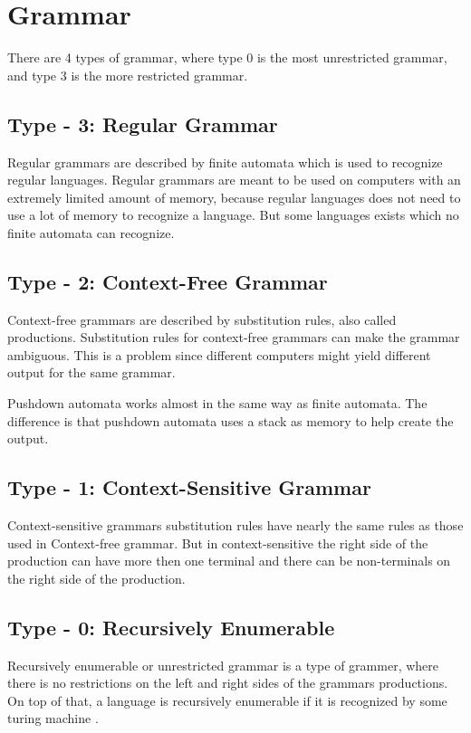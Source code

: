 \section{Grammar}
There are 4 types of grammar, where type 0 is the most unrestricted grammar, and type 3 is the more restricted grammar.

\subsection{Type - 3: Regular Grammar}
Regular grammars are described by finite automata which is used to recognize regular languages. Regular grammars are meant to be used on computers with an extremely limited amount of memory, because regular languages does not need to use a lot of memory to recognize a language. But some languages exists which no finite automata can recognize.

\subsection{Type - 2: Context-Free Grammar}
Context-free grammars are described by substitution rules, also called productions. Substitution rules for context-free grammars can make the grammar ambiguous.
This is a problem since different computers might yield different output for the same grammar.

Pushdown automata works almost in the same way as finite automata. The difference is that pushdown automata uses a stack as memory to help create the output. 

\subsection{Type - 1: Context-Sensitive Grammar}
Context-sensitive grammars substitution rules have nearly the same rules as those used in Context-free grammar. But in context-sensitive the right side of the production can have more then one terminal and there can be non-terminals on the right side of the production.

\subsection{Type - 0: Recursively Enumerable}
Recursively enumerable or unrestricted grammar is a type of grammer, where there is no restrictions on the left and right sides of the grammars productions. On top of that, a language is recursively enumerable if it is recognized by some turing machine \citep{sipser}.  %

